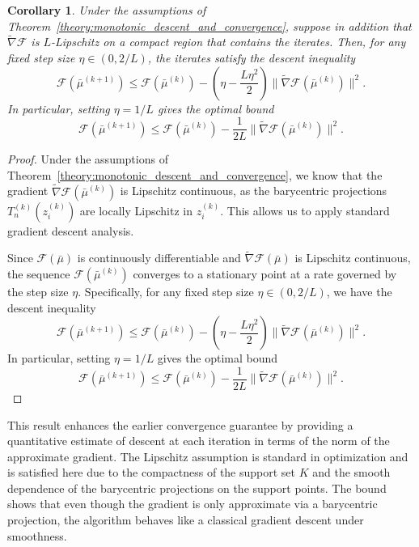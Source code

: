 \documentclass[11pt]{article}
\newtheorem{corollary}[theorem]{Corollary}
\newcommand{\calF}{\mathcal{F}}
\begin{document}
\begin{corollary}\label{theory:monotonic_descent_and_rate_of_convergence}
    Under the assumptions of Theorem~\ref{theory:monotonic_descent_and_convergence}, suppose in addition that $\widetilde{\nabla} \calF$ is $L$-Lipschitz on a compact region that contains the iterates. Then, for any fixed step size $\eta \in (0, 2/L)$, the iterates satisfy the descent inequality
    \[
        \mathcal{F}(\bar{\mu}^{(k+1)}) \leq \mathcal{F}(\bar{\mu}^{(k)}) - \left( \eta - \frac{L\eta^2}{2} \right) \|\widetilde{\nabla} \mathcal{F}(\bar{\mu}^{(k)})\|^2.
    \]
    In particular, setting $\eta = 1/L$ gives the optimal bound
    \[
        \mathcal{F}(\bar{\mu}^{(k+1)}) \leq \mathcal{F}(\bar{\mu}^{(k)}) - \frac{1}{2L} \|\widetilde{\nabla} \mathcal{F}(\bar{\mu}^{(k)})\|^2.
    \]
\end{corollary}
\begin{proof}
    Under the assumptions of Theorem~\ref{theory:monotonic_descent_and_convergence}, we know that the gradient $\widetilde{\nabla} \mathcal{F}(\bar{\mu}^{(k)})$ is Lipschitz continuous, as the barycentric projections \(T_n^{(k)}(z_i^{(k)})\) are locally Lipschitz in \(z_i^{(k)}\). This allows us to apply standard gradient descent analysis.

    Since $\mathcal{F}(\bar{\mu})$ is continuously differentiable and $\widetilde{\nabla} \mathcal{F}(\bar{\mu})$ is Lipschitz continuous, the sequence $\mathcal{F}(\bar{\mu}^{(k)})$ converges to a stationary point at a rate governed by the step size $\eta$. Specifically, for any fixed step size $\eta \in (0, 2/L)$, we have the descent inequality
    \[
        \mathcal{F}(\bar{\mu}^{(k+1)}) \leq \mathcal{F}(\bar{\mu}^{(k)}) - \left( \eta - \frac{L\eta^2}{2} \right) \|\widetilde{\nabla} \mathcal{F}(\bar{\mu}^{(k)})\|^2.
    \]
    In particular, setting $\eta = 1/L$ gives the optimal bound
    \[
        \mathcal{F}(\bar{\mu}^{(k+1)}) \leq \mathcal{F}(\bar{\mu}^{(k)}) - \frac{1}{2L} \|\widetilde{\nabla} \mathcal{F}(\bar{\mu}^{(k)})\|^2.
    \]
\end{proof}


This result enhances the earlier convergence guarantee by providing a quantitative estimate of descent at each iteration in terms of the norm of the approximate gradient. The Lipschitz assumption is standard in optimization and is satisfied here due to the compactness of the support set $K$ and the smooth dependence of the barycentric projections on the support points. The bound shows that even though the gradient is only approximate via a barycentric projection, the algorithm behaves like a classical gradient descent under smoothness.
\end{document}
